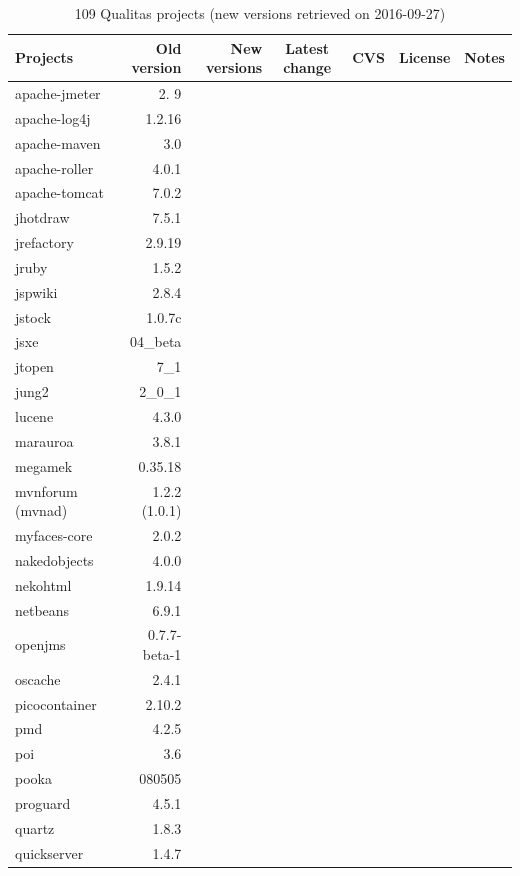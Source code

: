 \documentclass{sig-alternate-05-2015}
\begin{document}
\begin{table}
	\centering
	\caption{109 Qualitas projects (new versions retrieved on 2016-09-27)}
	\label{t:new_and_old}
	\small
	\begin{tabular}{l|r|r|c|c|p{3cm}|p{3cm}}
		\hline 
			Projects & Old version & New versions & Latest change & CVS & License & Notes \\
			\hline
			apache-jmeter & 2. 9 & & & & & \\
			apache-log4j & 1.2.16 & & & & & \\
			apache-maven & 3.0 & & & & & \\
			apache-roller & 4.0.1 & & & & & \\
			apache-tomcat & 7.0.2 & & & & & \\
			jhotdraw & 7.5.1 & & & & & \\
			jrefactory & 2.9.19 & & & & & \\
			jruby & 1.5.2 & & & & & \\
			jspwiki & 2.8.4 & & & & & \\
			jstock & 1.0.7c & & & & & \\
			jsxe & 04\_beta & & & & & \\
			jtopen & 7\_1 & & & & & \\
			jung2 & 2\_0\_1 & & & & & \\
			lucene & 4.3.0 & & & & & \\
			marauroa & 3.8.1 & & & & & \\
			megamek & 0.35.18 & & & & & \\
			mvnforum (mvnad) & 1.2.2 (1.0.1) & & & & & \\
			myfaces-core & 2.0.2 & & & & & \\
			nakedobjects & 4.0.0 & & & & & \\
			nekohtml & 1.9.14 & & & & & \\
			netbeans & 6.9.1 & & & & & \\
			openjms & 0.7.7-beta-1 & & & & & \\
			oscache & 2.4.1 & & & & & \\
			picocontainer & 2.10.2 & & & & & \\
			pmd & 4.2.5 & & & & & \\
			poi & 3.6 & & & & & \\
			pooka & 080505 & & & & & \\
			proguard & 4.5.1 & & & & & \\
			quartz & 1.8.3 & & & & & \\
			quickserver & 1.4.7 & & & & & \\

\end{tabular}
\end{table}
\end{document}
